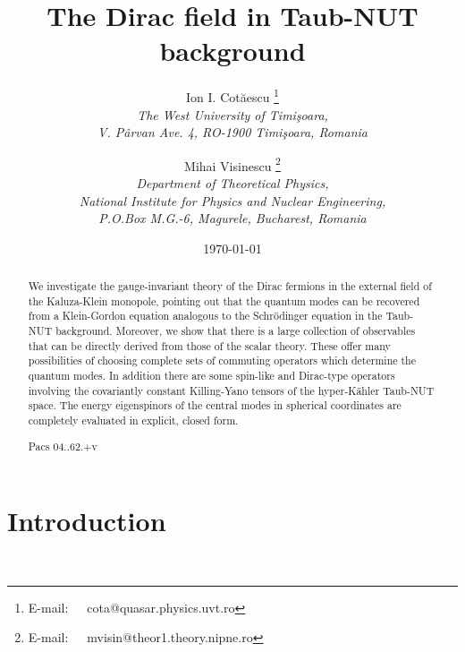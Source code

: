 \documentclass[a4paper,12pt]{article}
\begin{document}
\title{The Dirac field in Taub-NUT background}

\author{Ion I. Cot\u aescu \thanks{E-mail:~~~cota@quasar.physics.uvt.ro}\\ 
{\small \it The West University of Timi\c soara,}\\
       {\small \it V. P\^ arvan Ave. 4, RO-1900 Timi\c soara, Romania}
\and
Mihai Visinescu \thanks{E-mail:~~~mvisin@theor1.theory.nipne.ro}\\
{\small \it Department of Theoretical Physics,}\\
{\small \it National Institute for Physics and Nuclear Engineering,}\\
{\small \it P.O.Box M.G.-6, Magurele, Bucharest, Romania}}
\date{\today}

\maketitle

\begin{abstract}
We investigate the \coordHE{} gauge-invariant theory of the Dirac fermions 
in the external field of the Kaluza-Klein monopole, pointing out that the 
quantum modes can be recovered from a Klein-Gordon equation analogous to the 
Schr\" odinger equation in the Taub-NUT background. Moreover, we show that 
there is a large collection of observables  that can be directly derived 
from those of the scalar theory. These offer many possibilities of choosing 
complete sets of commuting operators which determine the quantum modes. 
In addition there are some spin-like and Dirac-type operators involving 
the covariantly constant Killing-Yano tensors of the hyper-K\"ahler 
Taub-NUT space. The energy eigenspinors of the central modes in spherical 
coordinates are completely evaluated in explicit, closed form. 

Pacs 04..62.+v

\end{abstract}

\newpage

\section{Introduction}
\
\end{document}
